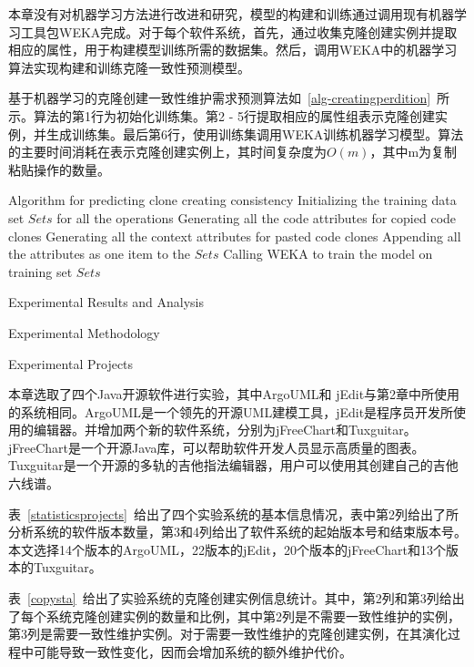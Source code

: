 本章没有对机器学习方法进行改进和研究，模型的构建和训练通过调用现有机器学习工具包WEKA完成。对于每个软件系统，首先，通过收集克隆创建实例并提取相应的属性，用于构建模型训练所需的数据集。然后，调用WEKA中的机器学习算法实现构建和训练克隆一致性预测模型。

基于机器学习的克隆创建一致性维护需求预测算法如~\ref{alg-creatingperdition}~所示。算法的第1行为初始化训练集。第2 - 5行提取相应的属性组表示克隆创建实例，并生成训练集。最后第6行，使用训练集调用WEKA训练机器学习模型。算法的主要时间消耗在表示克隆创建实例上，其时间复杂度为$O(m)$，其中m为复制粘贴操作的数量。

\vspace{1em}
\begin{minipage}{0.8\textwidth}
\centering
\begin{algorithm}[H]
 {Algorithm for predicting clone creating consistency}
\label{alg-creatingperdition}
Initializing the training data set $Sets$ for all the operations\; 
{ 
Generating all the code attributes for copied code clones\;
Generating all the context attributes for pasted code clones\;
Appending all the attributes as one item to the $Sets$\;
}
Calling WEKA to train the model on training set $Sets$\;
\end{algorithm}
\end{minipage}
\vspace{1em}

{Experimental Results and Analysis}

{Experimental Methodology}

{Experimental Projects}

本章选取了四个Java开源软件进行实验，其中ArgoUML和 jEdit与第2章中所使用的系统相同。ArgoUML是一个领先的开源UML建模工具，jEdit是程序员开发所使用的编辑器。并增加两个新的软件系统，分别为jFreeChart和Tuxguitar。jFreeChart是一个开源Java库，可以帮助软件开发人员显示高质量的图表。Tuxguitar是一个开源的多轨的吉他指法编辑器，用户可以使用其创建自己的吉他六线谱。

表~\ref{statisticsprojects}~给出了四个实验系统的基本信息情况，表中第2列给出了所分析系统的软件版本数量，第3和4列给出了软件系统的起始版本号和结束版本号。本文选择14个版本的ArgoUML，22版本的jEdit，20个版本的jFreeChart和13个版本的Tuxguitar。

表~\ref{copysta}~给出了实验系统的克隆创建实例信息统计。其中，第2列和第3列给出了每个系统克隆创建实例的数量和比例，其中第2列是不需要一致性维护的实例，第3列是需要一致性维护实例。对于需要一致性维护的克隆创建实例，在其演化过程中可能导致一致性变化，因而会增加系统的额外维护代价。

